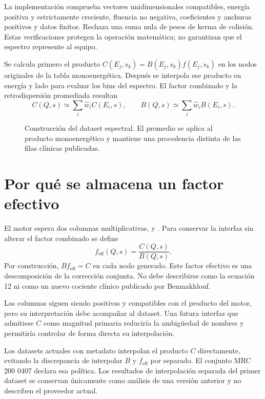 La implementación comprueba vectores unidimensionales compatibles, energía positiva y estrictamente creciente, fluencia no negativa, coeficientes y anchuras positivos y datos finitos. Rechaza una suma nula de pesos de kerma de colisión. Estas verificaciones protegen la operación matemática; no garantizan que el espectro represente al equipo.

Se calcula primero el producto $C(E_j,s_k)=B(E_j,s_k)f(E_j,s_k)$ en los nodos originales de la tabla monoenergética. Después se interpola ese producto en energía y lado para evaluar los bins del espectro. El factor combinado y la retrodispersión promediada resultan
\begin{equation}
C(Q,s)\simeq\sum_i\widehat w_i C(E_i,s),\qquad
B(Q,s)\simeq\sum_i\widehat w_i B(E_i,s).
\end{equation}
\begin{figure}[htbp]\centering
\caption{Construcción del dataset espectral. El promedio se aplica al producto monoenergético y mantiene una procedencia distinta de las filas clínicas publicadas.}\end{figure}

\section{Por qué se almacena un factor efectivo}
El motor espera dos columnas multiplicativas,  y . Para conservar la interfaz sin alterar el factor combinado se define
\begin{equation}\label{eq:feff}
f_{\mathrm{eff}}(Q,s)=\frac{C(Q,s)}{B(Q,s)}.
\end{equation}
Por construcción, $Bf_{\mathrm{eff}}=C$ en cada nodo generado. Este factor efectivo es una descomposición de la corrección conjunta. No debe describirse como la ecuación 12 ni como un nuevo cociente clínico publicado por Benmakhlouf.

Las columnas siguen siendo positivas y compatibles con el producto del motor, pero su interpretación debe acompañar al dataset. Una futura interfaz que admitiese $C$ como magnitud primaria reduciría la ambigüedad de nombres y permitiría controlar de forma directa su interpolación.

Los datasets actuales con metadato  interpolan el producto $C$ directamente, evitando la discrepancia de interpolar $B$ y $f_{\mathrm{eff}}$ por separado. El conjunto MRC 200 0407 declara esa política. Los resultados de interpolación separada del primer dataset se conservan únicamente como análisis de una versión anterior y no describen el proveedor actual.

